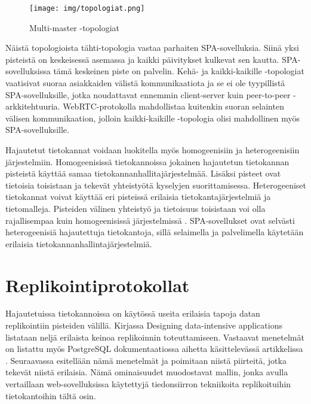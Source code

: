 \documentclass[finnish,twoside,censored,csm,sw-track-2018]{HYthesisML}
\begin{document}
\begin{figure}[ht]
  \centering
    \texttt{[image: img/topologiat.png]}
  \caption{Multi-master -topologiat}
  \label{fig-multimaster-topologiat}
\end{figure}

Näistä topologioista tähti-topologia vastaa parhaiten SPA-sovelluksia. Siinä yksi pisteistä on keskeisessä asemassa ja kaikki päivitykset kulkevat sen kautta. SPA-sovelluksissa tämä keskeinen piste on palvelin. Kehä- ja kaikki-kaikille -topologiat vaatisivat suoraa asiakkaiden välistä kommunikaatiota ja se ei ole tyypillistä SPA-sovelluksille, jotka noudattavat ennemmin client-server kuin peer-to-peer -arkkitehtuuria. WebRTC-protokolla mahdollistaa kuitenkin suoran selainten välisen kommunikaation, jolloin kaikki-kaikille -topologia olisi mahdollinen myös SPA-sovelluksille.


Hajautetut tietokannat voidaan luokitella myös homogeenisiin ja heterogeenisiin järjestelmiin. Homogeenisissä tietokannoissa jokainen hajautetun tietokannan pisteistä käyttää samaa tietokannanhallitajärjestelmää. Lisäksi pisteet ovat tietoisia toisistaan ja tekevät yhteistyötä kyselyjen suorittamisessa. Heterogeeniset tietokannat voivat käyttää eri pisteissä erilaisia tietokantajärjestelmiä ja tietomalleja. Pisteiden välinen yhteistyö ja tietoisuus toisistaan voi olla rajallisempaa kuin homogeenisissä järjestelmissä \citep{DSC}. SPA-sovellukset ovat selvästi heterogeenisiä hajautettuja tietokantoja, sillä selaimella ja palvelimella käytetään erilaisia tietokannanhallintajärjestelmiä.

\chapter{Replikointiprotokollat}
\label{sec-protokolla-teoria}

Hajautetuissa tietokannoissa on käytössä useita erilaisia tapoja datan replikointiin pisteiden välillä. Kirjassa Designing data-intensive applications \citep{Kleppmann} listataan neljä erilaista keinoa replikoinnin toteuttamiseen. Vastaavat menetelmät on listattu myös PostgreSQL dokumentaatiossa aihetta käsittelevässä artikkelissa \citep{postgres-replication-solutions}. Seuraavassa esitellään nämä menetelmät ja poimitaan niistä piirteitä, jotka tekevät niistä erilaisia. Nämä ominaisuudet muodostavat mallin, jonka avulla vertaillaan web-sovelluksissa käytettyjä tiedonsiirron tekniikoita replikoituihin tietokantoihin tältä osin.
\end{document}
